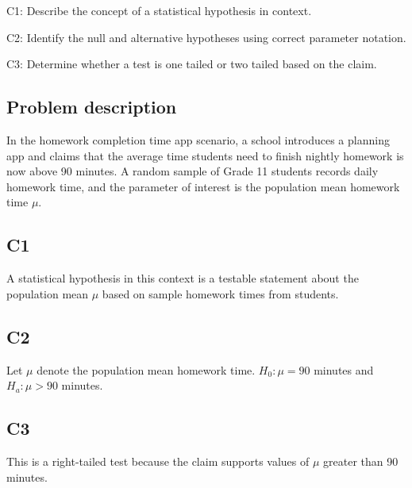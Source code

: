 



	\begin{ExamCriteria}
		\item C1: Describe the concept of a statistical hypothesis in context.
		\item C2: Identify the null and alternative hypotheses using correct parameter notation.
		\item C3: Determine whether a test is one tailed or two tailed based on the claim.
	\end{ExamCriteria}


	\begin{ExamProblems}

		\item
		\subsection*{Problem description}
		In the homework completion time app scenario, a school introduces a planning app and claims that the average time students need to finish nightly homework is now above 90 minutes. A random sample of Grade 11 students records daily homework time, and the parameter of interest is the population mean homework time \(\mu\).

		\subsection*{C1}
		A statistical hypothesis in this context is a testable statement about the population mean \(\mu\) based on sample homework times from students.

		\subsection*{C2}
		Let \(\mu\) denote the population mean homework time. \(H_0\colon \mu = 90\) minutes and \(H_a\colon \mu > 90\) minutes.

		\subsection*{C3}
		This is a right-tailed test because the claim supports values of \(\mu\) greater than 90 minutes.


\end{ExamProblems}

